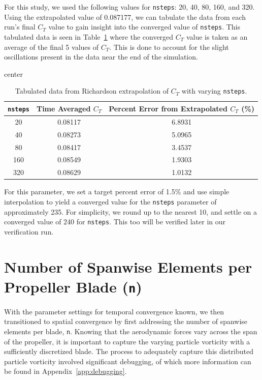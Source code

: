 \documentclass{report}
\begin{document}
For this study, we used the following values for \texttt{nsteps}: 20, 40, 80, 160, and 320. Using the extrapolated value of 0.087177, we can tabulate the data from each run's final $C_T$ value to gain insight into the converged value of \texttt{nsteps}.
This tabulated data is seen in Table~\ref{tab:nsteps_per_rev_richardson} where the converged $C_T$ value is taken as an average of the final 5 values of $C_T$. This is done to account for the slight oscillations present in the data near the end of the simulation.

\begin{table}[H]
    \centering
    \caption{Tabulated data from Richardson extrapolation of $C_T$ with varying \texttt{nsteps}.}\label{tab:nsteps_per_rev_richardson}
    \begin{adjustbox}{center}
    \begin{tabular}{c c c}
        \toprule
        \textbf{\texttt{nsteps}} & \textbf{Time Averaged $C_T$} & \textbf{Percent Error from Extrapolated $C_T$ (\%)} \\
        \midrule
        20 & 0.08117 & 6.8931 \\
        40 & 0.08273 & 5.0965 \\
        80 & 0.08417 & 3.4537 \\
        160 & 0.08549 & 1.9303 \\
        320 & 0.08629 & 1.0132 \\
        \bottomrule
    \end{tabular}
    \end{adjustbox}
\end{table}

For this parameter, we set a target percent error of 1.5\% and use simple interpolation to yield a converged value for the \texttt{nsteps} parameter of approximately 235.
For simplicity, we round up to the nearest 10, and settle on a converged value of 240 for \texttt{nsteps}. This too will be verified later in our verification run.


\section{Number of Spanwise Elements per Propeller Blade (\texttt{n})}\label{n_convergence}
With the parameter settings for temporal convergence known, we then transitioned to spatial convergence by first addressing the number of spanwise elements per blade, \texttt{n}.
Knowing that the aerodynamic forces vary across the span of the propeller, it is important to capture the varying particle vorticity with a sufficiently discretized blade.
The process to adequately capture this distributed particle vorticity involved significant debugging, of which more information can be found in Appendix~\ref{app:debugging}.
\end{document}

